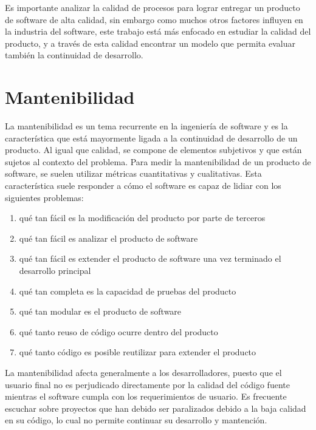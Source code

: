 Es importante analizar la calidad de procesos para lograr entregar un producto
de software de alta calidad, sin embargo como muchos otros factores influyen
en la industria del software, este trabajo está más enfocado en estudiar
la calidad del producto, y a través de esta calidad encontrar un modelo que
permita evaluar también la continuidad de desarrollo.

\section{Mantenibilidad}

La mantenibilidad es un tema recurrente en la ingeniería de software y es la característica que
está mayormente ligada a la continuidad de desarrollo de un producto.
Al igual que calidad, se compone de elementos subjetivos y que están sujetos
al contexto del problema. Para medir la mantenibilidad de un producto de
software, se suelen utilizar métricas cuantitativas y cualitativas.
Esta característica suele responder a cómo el software es capaz de lidiar
con los siguientes problemas:
\begin{enumerate}
	\item qué tan fácil es la modificación del producto por parte de terceros
	\item qué tan fácil es analizar el producto de software
	\item qué tan fácil es extender el producto de software una vez terminado el desarrollo principal
	\item qué tan completa es la capacidad de pruebas del producto
	\item qué tan modular es el producto de software
	\item qué tanto reuso de código ocurre dentro del producto
    \item qué tanto código es posible reutilizar para extender el producto
\end{enumerate}

La mantenibilidad afecta generalmente a los desarrolladores,
puesto que el usuario final no es perjudicado directamente por la calidad
del código fuente mientras el software cumpla con los requerimientos de usuario.
Es frecuente escuchar sobre proyectos que han debido ser paralizados
debido a la baja calidad en su código, lo cual no permite continuar su desarrollo y mantención.
